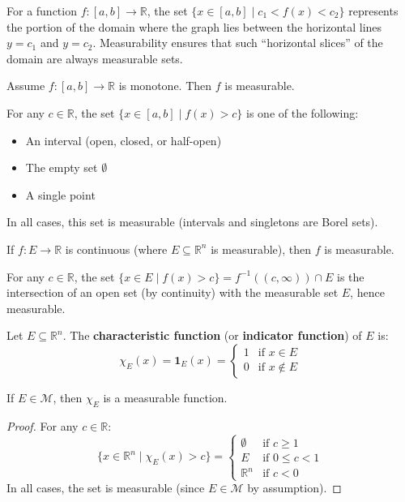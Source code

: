 \documentclass[11pt]{report}
\begin{document}
\begin{rembox}
For a function $f: [a, b] \to \mathbb{R}$, the set $\{x \in [a, b] \mid c_1 < f(x) < c_2\}$ represents the portion of the domain where the graph lies between the horizontal lines $y = c_1$ and $y = c_2$. Measurability ensures that such ``horizontal slices'' of the domain are always measurable sets.
\end{rembox}

\begin{exbox}
Assume $f: [a, b] \to \mathbb{R}$ is monotone. Then $f$ is measurable.

For any $c \in \mathbb{R}$, the set $\{x \in [a, b] \mid f(x) > c\}$ is one of the following:
\begin{itemize}
    \item An interval (open, closed, or half-open)
    \item The empty set $\emptyset$
    \item A single point
\end{itemize}
In all cases, this set is measurable (intervals and singletons are Borel sets).
\end{exbox}

\begin{exbox}
If $f: E \to \mathbb{R}$ is continuous (where $E \subseteq \mathbb{R}^n$ is measurable), then $f$ is measurable.

For any $c \in \mathbb{R}$, the set $\{x \in E \mid f(x) > c\} = f^{-1}((c, \infty)) \cap E$ is the intersection of an open set (by continuity) with the measurable set $E$, hence measurable.
\end{exbox}

\begin{defbox}
Let $E \subseteq \mathbb{R}^n$. The \textbf{characteristic function} (or \textbf{indicator function}) of $E$ is:
\[
\chi_E(x) = \mathbf{1}_E(x) = \begin{cases} 1 & \text{if } x \in E \\ 0 & \text{if } x \notin E \end{cases}
\]
\end{defbox}

\begin{propbox}
If $E \in \mathcal{M}$, then $\chi_E$ is a measurable function.
\end{propbox}

\begin{proof}
For any $c \in \mathbb{R}$:
\[
\{x \in \mathbb{R}^n \mid \chi_E(x) > c\} = \begin{cases}
\emptyset & \text{if } c \geq 1 \\
E & \text{if } 0 \leq c < 1 \\
\mathbb{R}^n & \text{if } c < 0
\end{cases}
\]
In all cases, the set is measurable (since $E \in \mathcal{M}$ by assumption).
\end{proof}
\end{document}

